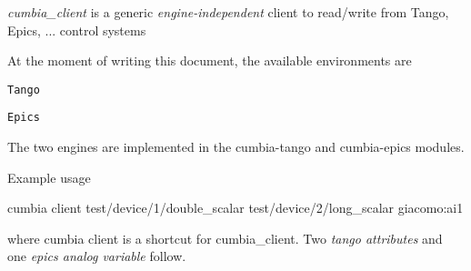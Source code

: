 {\itshape cumbia\+\_\+client} is a generic {\itshape engine-\/independent} client to read/write from Tango, Epics, ... control systems

At the moment of writing this document, the available environments are


\begin{DoxyItemize}
\item {\tt Tango}
\item {\tt Epics}
\end{DoxyItemize}

The two engines are implemented in the cumbia-\/tango and cumbia-\/epics modules.

\begin{DoxyParagraph}{Example usage}

\end{DoxyParagraph}

\begin{DoxyCode}
cumbia client test/device/1/double\_scalar   test/device/2/long\_scalar  giacomo:ai1
\end{DoxyCode}


where cumbia client is a shortcut for cumbia\+\_\+client. Two {\itshape tango attributes} and one {\itshape epics analog variable} follow. 